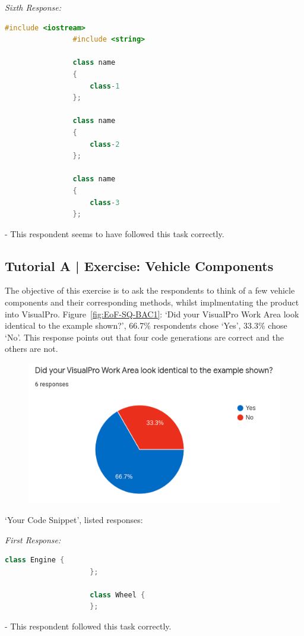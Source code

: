 \documentclass[12pt]{report} %
\begin{document}
			\textit{Sixth Response:}
			\begin{lstlisting}[language=c++]
				#include <iostream>
				#include <string>

				class name
				{
					class-1
				};

				class name
				{
					class-2
				};

				class name
				{
					class-3
				};
			\end{lstlisting} - This respondent seems to have followed this task correctly.

			\subsection{Tutorial A | Exercise: Vehicle Components}
				The objective of this exercise is to ask the respondents to think of a few vehicle components and their corresponding methods, whilst implmentating the product into VisualPro. Figure~\ref{fig:EoF-SQ-BAC1}: `Did your VisualPro Work Area look identical to the example shown?', 66.7\% respondents chose `Yes', 33.3\% chose `No'. This response points out that four code generations are correct and the others are not.

				\begin{figure}[H]
					{\includegraphics[scale=0.50]{Figures/VisualPro-Survey_Results/SQ-BAC1.png}}
				\end{figure}
				
				`Your Code Snippet', listed responses:

				\textit{First Response:}
				\begin{lstlisting}[language=c++]
					class Engine {
					};

					class Wheel {
					};
				\end{lstlisting} - This respondent followed this task correctly.
\end{document}
